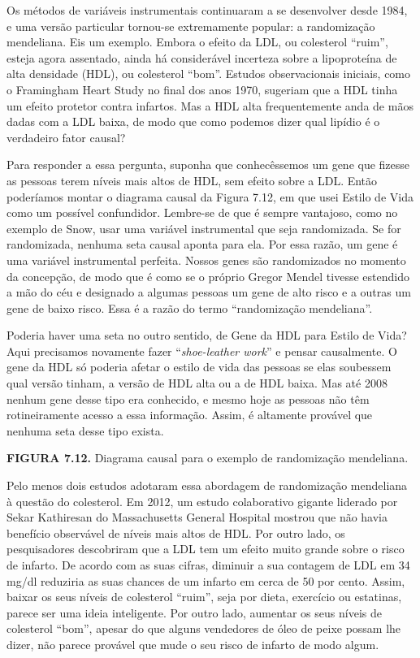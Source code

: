 \documentclass[11pt,a5paper,twoside]{book}
\begin{document}
Os métodos de variáveis instrumentais continuaram a se desenvolver desde 1984, e uma versão particular tornou-se extremamente popular: a randomização mendeliana. Eis um exemplo. Embora o efeito da LDL, ou colesterol “ruim”, esteja agora assentado, ainda há considerável incerteza sobre a lipoproteína de alta densidade (HDL), ou colesterol “bom”. Estudos observacionais iniciais, como o Framingham Heart Study no final dos anos 1970, sugeriam que a HDL tinha um efeito protetor contra infartos. Mas a HDL alta frequentemente anda de mãos dadas com a LDL baixa, de modo que como podemos dizer qual lipídio é o verdadeiro fator causal?

Para responder a essa pergunta, suponha que conhecêssemos um gene que fizesse as pessoas terem níveis mais altos de HDL, sem efeito sobre a LDL. Então poderíamos montar o diagrama causal da Figura 7.12, em que usei Estilo de Vida como um possível confundidor. Lembre-se de que é sempre vantajoso, como no exemplo de Snow, usar uma variável instrumental que seja randomizada. Se for randomizada, nenhuma seta causal aponta para ela. Por essa razão, um gene é uma variável instrumental perfeita. Nossos genes são randomizados no momento da concepção, de modo que é como se o próprio Gregor Mendel tivesse estendido a mão do céu e designado a algumas pessoas um gene de alto risco e a outras um gene de baixo risco. Essa é a razão do termo “randomização mendeliana”.

Poderia haver uma seta no outro sentido, de Gene da HDL para Estilo de Vida? Aqui precisamos novamente fazer “\textit{shoe-leather work}” e pensar causalmente. O gene da HDL só poderia afetar o estilo de vida das pessoas se elas soubessem qual versão tinham, a versão de HDL alta ou a de HDL baixa. Mas até 2008 nenhum gene desse tipo era conhecido, e mesmo hoje as pessoas não têm rotineiramente acesso a essa informação. Assim, é altamente provável que nenhuma seta desse tipo exista.

\textbf{FIGURA 7.12.} Diagrama causal para o exemplo de randomização mendeliana.

Pelo menos dois estudos adotaram essa abordagem de randomização mendeliana à questão do colesterol. Em 2012, um estudo colaborativo gigante liderado por Sekar Kathiresan do Massachusetts General Hospital mostrou que não havia benefício observável de níveis mais altos de HDL. Por outro lado, os pesquisadores descobriram que a LDL tem um efeito muito grande sobre o risco de infarto. De acordo com as suas cifras, diminuir a sua contagem de LDL em 34 mg/dl reduziria as suas chances de um infarto em cerca de 50 por cento. Assim, baixar os seus níveis de colesterol “ruim”, seja por dieta, exercício ou estatinas, parece ser uma ideia inteligente. Por outro lado, aumentar os seus níveis de colesterol “bom”, apesar do que alguns vendedores de óleo de peixe possam lhe dizer, não parece provável que mude o seu risco de infarto de modo algum.
\end{document}
